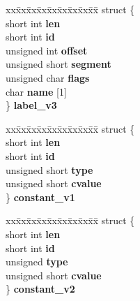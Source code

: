 \begin{DoxyCompactItemize}
\begin{tabbing}
\end{tabbing}\item 
\mbox{\label{unioncodeview__symbol_a21fd8e0e82e5f854dda33675f1c874ce}} 
\begin{tabbing}
xx\=xx\=xx\=xx\=xx\=xx\=xx\=xx\=xx\=\kill
struct \{\\
\>short int {\bfseries len}\\
\>short int {\bfseries id}\\
\>unsigned int {\bfseries offset}\\
\>unsigned short {\bfseries segment}\\
\>unsigned char {\bfseries flags}\\
\>char {\bfseries name} \mbox{[}1\mbox{]}\\
\} {\bfseries label\_v3}\\

\end{tabbing}\item 
\mbox{\label{unioncodeview__symbol_a7ce4284d74a98857206cef4a394e412d}} 
\begin{tabbing}
xx\=xx\=xx\=xx\=xx\=xx\=xx\=xx\=xx\=\kill
struct \{\\
\>short int {\bfseries len}\\
\>short int {\bfseries id}\\
\>unsigned short {\bfseries type}\\
\>unsigned short {\bfseries cvalue}\\
\} {\bfseries constant\_v1}\\

\end{tabbing}\item 
\mbox{\label{unioncodeview__symbol_a6e5baac180a5ffda03f3abf9f81ad2fa}} 
\begin{tabbing}
xx\=xx\=xx\=xx\=xx\=xx\=xx\=xx\=xx\=\kill
struct \{\\
\>short int {\bfseries len}\\
\>short int {\bfseries id}\\
\>unsigned {\bfseries type}\\
\>unsigned short {\bfseries cvalue}\\
\} {\bfseries constant\_v2}\\


\end{tabbing}
\end{DoxyCompactItemize}
